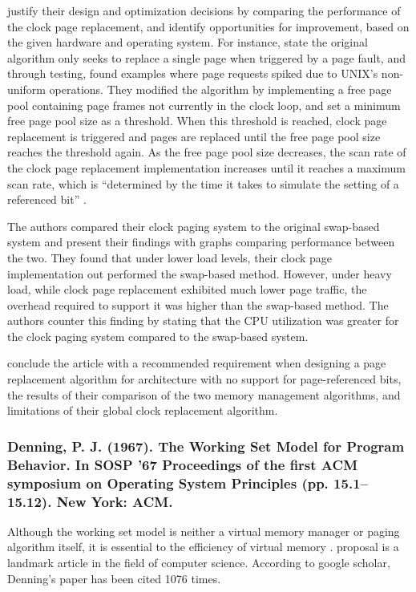 \citet{Babaoglu1981} justify their design and optimization decisions by comparing the performance of the clock page replacement, and identify opportunities for improvement, based on the given hardware and operating system. For instance, \citet[p. 80]{Babaoglu1981} state the original algorithm only seeks to replace a single page when triggered by a page fault, and through testing, found examples where page requests spiked due to UNIX's non-uniform operations. They modified the algorithm by implementing a free page pool containing page frames not currently in the clock loop, and set a minimum free page pool size as a threshold. When this threshold is reached, clock page replacement is triggered and pages are replaced until the free page pool size reaches the threshold again. As the free page pool size decreases, the scan rate of the clock page replacement implementation increases until it reaches a maximum scan rate, which is ``determined by the time it takes to simulate the setting of a referenced bit'' \citep[p. 80]{Babaoglu1981}.

The authors compared their clock paging system to the original swap-based system and present their findings with graphs comparing performance between the two. They found that under lower load levels, their clock page implementation out performed the swap-based method. However, under heavy load, while clock page replacement exhibited much lower page traffic, the overhead required to support it was higher than the swap-based method. The authors counter this finding by stating that the CPU utilization was greater for the clock paging system compared to the swap-based system.

\citet{Babaoglu1981} conclude the article with a recommended requirement when designing a page replacement algorithm for architecture with no support for page-referenced bits, the results of their comparison of the two memory management algorithms, and limitations of their global clock replacement algorithm.

\subsubsection*{Denning, P. J. (1967). The Working Set Model for Program Behavior. In SOSP ’67 Proceedings of the first ACM symposium on Operating System Principles (pp. 15.1–15.12). New York: ACM.}

Although the working set model is neither a virtual memory manager or paging algorithm itself, it is essential to the efficiency of virtual memory \citep{Silberschatz2013}.  proposal is a landmark article in the field of computer science. According to google scholar, Denning's paper has been cited 1076 times.

